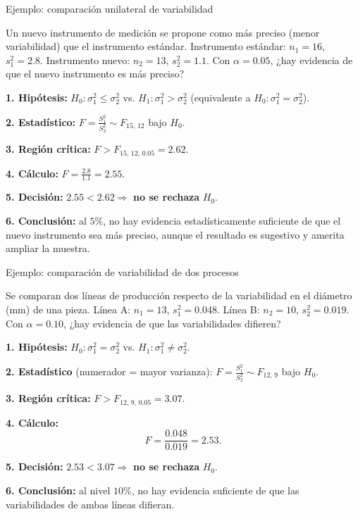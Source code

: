 \documentclass[aspectratio=169,11pt]{beamer}
\begin{document}
\begin{frame}{Ejemplo: comparación unilateral de variabilidad}
\begin{example}
Un nuevo instrumento de medición se propone como más preciso (menor variabilidad) que el instrumento estándar. Instrumento estándar: $n_1=16$, $s_1^2=2.8$. Instrumento nuevo: $n_2=13$, $s_2^2=1.1$. Con $\alpha=0.05$, ¿hay evidencia de que el nuevo instrumento es más preciso?

\textbf{1. Hipótesis:} $H_0:\sigma_1^2\le\sigma_2^2$ vs. $H_1:\sigma_1^2>\sigma_2^2$ (equivalente a $H_0:\sigma_1^2=\sigma_2^2$).

\textbf{2. Estadístico:} $\displaystyle F=\frac{S_1^2}{S_2^2}\sim F_{15,\,12}$ bajo $H_0$.

\textbf{3. Región crítica:} $F>F_{15,\,12,\,0.05}=2.62$.

\textbf{4. Cálculo:} $\displaystyle F=\frac{2.8}{1.1}=2.55$.

\textbf{5. Decisión:} $2.55<2.62\Rightarrow$ \textbf{no se rechaza} $H_0$.

\textbf{6. Conclusión:} al $5\%$, no hay evidencia estadísticamente suficiente de que el nuevo instrumento sea más preciso, aunque el resultado es sugestivo y amerita ampliar la muestra.
\end{example}
\end{frame}

\begin{frame}{Ejemplo: comparación de variabilidad de dos procesos}
\begin{example}
Se comparan dos líneas de producción respecto de la variabilidad en el diámetro (mm) de una pieza. Línea A: $n_1=13$, $s_1^2=0.048$. Línea B: $n_2=10$, $s_2^2=0.019$. Con $\alpha=0.10$, ¿hay evidencia de que las variabilidades difieren?

\textbf{1. Hipótesis:} $H_0:\sigma_1^2=\sigma_2^2$ vs. $H_1:\sigma_1^2\neq\sigma_2^2$.

\textbf{2. Estadístico} (numerador = mayor varianza): $\displaystyle F=\frac{S_1^2}{S_2^2}\sim F_{12,\,9}$ bajo $H_0$.

\textbf{3. Región crítica:} $F>F_{12,\,9,\,0.05}=3.07$.

\textbf{4. Cálculo:}
\[
F=\frac{0.048}{0.019}=2.53.
\]

\textbf{5. Decisión:} $2.53<3.07 \Rightarrow$ \textbf{no se rechaza} $H_0$.

\textbf{6. Conclusión:} al nivel $10\%$, no hay evidencia suficiente de que las variabilidades de ambas líneas difieran.
\end{example}
\end{frame}
\end{document}
